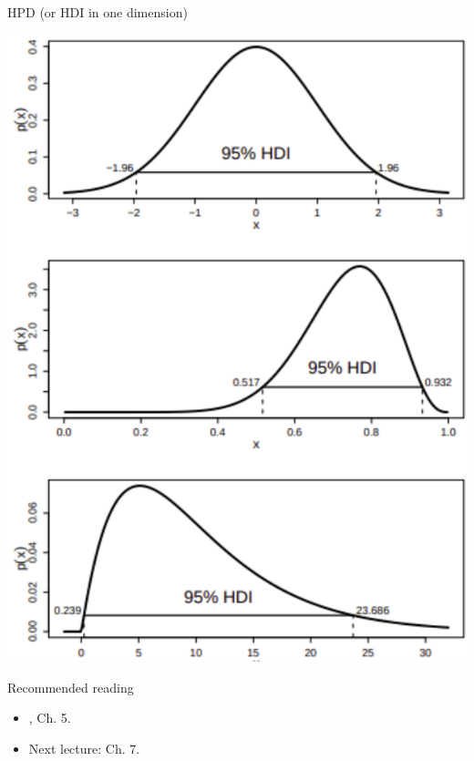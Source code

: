 \begin{frame}{HPD (or HDI in one dimension)}
 \begin{center}
 \includegraphics[scale=0.5]{figures/HDI.pdf}
\end{center}
\end{frame}
\begin{frame}{Recommended reading}
\begin{itemize}
  \item[\faBook] \cite{Robert2007}, Ch. 5.
 \item[\faForward] Next lecture: \cite{Robert2007} Ch. 7.
 \end{itemize} 
\end{frame}
